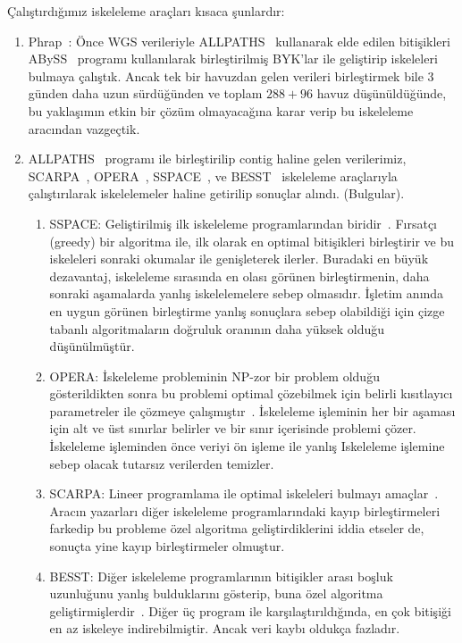 \documentclass[11pt]{article}
\begin{document}
Çalıştırdığımız iskeleleme araçları kısaca şunlardır:

\begin{enumerate}

\item Phrap~\cite{phrap}: Önce WGS verileriyle ALLPATHS~\cite{Gnerre2011} kullanarak elde edilen bitişikleri ABySS~\cite{Simpson2009} programı kullanılarak birleştirilmiş BYK'lar ile geliştirip iskeleleri bulmaya çalıştık. Ancak tek bir havuzdan gelen verileri birleştirmek bile  3 günden daha uzun sürdüğünden ve toplam $288 + 96$ havuz düşünüldüğünde, bu yaklaşımın etkin bir çözüm olmayacağına karar verip bu iskeleleme aracından vazgeçtik.
  
\item ALLPATHS~\cite{Gnerre2011} programı ile birleştirilip contig haline gelen verilerimiz, SCARPA~\cite{Donmez2013}, OPERA~\cite{Gao2011}, SSPACE~\cite{Boetzer2011}, ve BESST~\cite{Sahlin2014} iskeleleme araçlarıyla çalıştırılarak iskelelemeler haline getirilip sonuçlar alındı. (Bulgular). 
  
  \begin{enumerate}
    \item
      SSPACE: Geliştirilmiş ilk iskeleleme programlarından biridir~\cite{Boetzer2011}. Fırsatçı (greedy) bir algoritma ile, ilk olarak en optimal bitişikleri birleştirir ve bu iskeleleri sonraki okumalar ile genişleterek ilerler. Buradaki en büyük dezavantaj, iskeleleme sırasında en olası görünen birleştirmenin, daha sonraki aşamalarda yanlış iskelelemelere sebep olmasıdır. İşletim anında en uygun görünen birleştirme yanlış sonuçlara sebep olabildiği için çizge tabanlı algoritmaların doğruluk oranının daha yüksek olduğu düşünülmüştür. 

    \item OPERA: İskeleleme probleminin NP-zor bir problem olduğu gösterildikten sonra bu problemi optimal çözebilmek için belirli  kısıtlayıcı parametreler ile çözmeye çalışmıştır~\cite{Gao2011}. İskeleleme işleminin her bir aşaması için alt ve üst sınırlar belirler ve bir sınır içerisinde problemi çözer. İskeleleme işleminden önce veriyi ön işleme ile yanlış Iskeleleme işlemine sebep olacak  tutarsız verilerden temizler.
      
    \item SCARPA: Lineer programlama ile optimal iskeleleri bulmayı amaçlar~\cite{Donmez2013}. Aracın yazarları diğer iskeleleme programlarındaki kayıp birleştirmeleri farkedip bu probleme özel algoritma geliştirdiklerini iddia etseler de, sonuçta yine kayıp birleştirmeler olmuştur.
      
\item BESST: Diğer iskeleleme programlarının bitişikler arası boşluk uzunluğunu yanlış bulduklarını gösterip, buna özel algoritma geliştirmişlerdir~\cite{Sahlin2014}. Diğer üç program ile karşılaştırıldığında, en çok bitişiği en az iskeleye indirebilmiştir. Ancak veri kaybı oldukça fazladır.
  \end{enumerate}

\end{enumerate}
\end{document}
